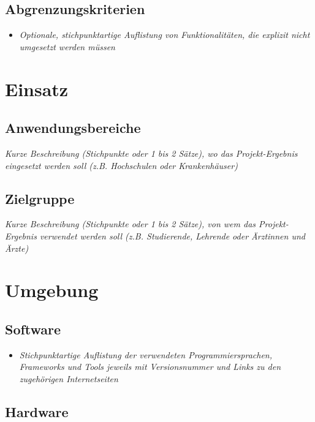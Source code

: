 \documentclass[a4paper,10pt]{scrartcl}
\begin{document}
\subsection{Abgrenzungskriterien}

\begin{itemize}
    \item \textit{Optionale, stichpunktartige Auflistung von Funktionalitäten, die explizit nicht umgesetzt werden müssen}
\end{itemize}


\section{Einsatz}

\subsection{Anwendungsbereiche}

\textit{Kurze Beschreibung (Stichpunkte oder 1 bis 2 Sätze), wo das Projekt-Ergebnis eingesetzt werden soll (z.B. Hochschulen oder Krankenhäuser)}

\subsection{Zielgruppe}

\textit{Kurze Beschreibung (Stichpunkte oder 1 bis 2 Sätze), von wem das Projekt-Ergebnis verwendet werden soll (z.B. Studierende, Lehrende oder Ärztinnen und Ärzte)}


\section{Umgebung}

\subsection{Software}

\begin{itemize}
    \item \textit{Stichpunktartige Auflistung der verwendeten Programmiersprachen, Frameworks und Tools jeweils mit Versionsnummer und Links zu den zugehörigen Internetseiten}
\end{itemize}

\subsection{Hardware}
\end{document}
